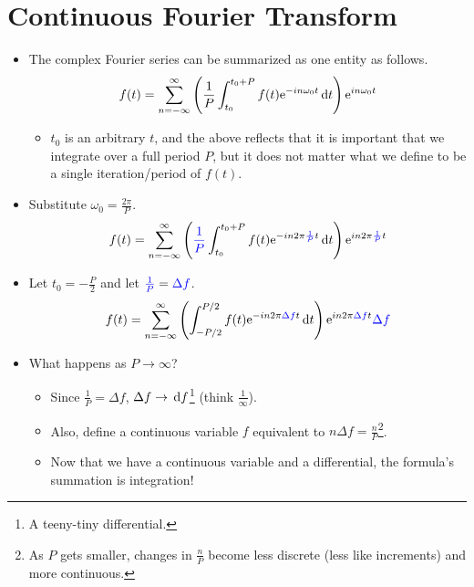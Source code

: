 \documentclass{article}
\begin{document}
\section*{Continuous Fourier Transform}
\begin{itemize}
    \item {}The complex Fourier series can be summarized as one entity as follows.
    \begin{equation*}
        f(t) = \sum_{n=-\infty}^\infty \left( \frac{1}{P}\int_{t_0}^{t_0+P} f(t)\e[-in\omega_0t]\D{t} \right)\e[in\omega_0t]
    \end{equation*}
    \begin{itemize}
        \item $t_0$ is an arbitrary $t$, and the above reflects that it is important that we integrate over a full period $P$, but it does not matter what we define to be a single iteration/period of $f(t)$.
    \end{itemize}
    \item Substitute $\omega_0 = \frac{2\pi}{P}$.
    \begin{equation*}
        f(t) = \sum_{n=-\infty}^\infty \left( {\color{blue}\frac{1}{P}}\int_{t_0}^{t_0+P} f(t)\e[-in2\pi{\color{blue}\frac{1}{P}}t]\D{t} \right)\e[in2\pi{\color{blue}\frac{1}{P}}t]
    \end{equation*}
    \item Let $t_0=-\frac{P}{2}$ and let ${\color{blue}\frac{1}{P}} = {\color{blue}\Delta f}$.
    \begin{equation*}
        f(t) = \sum_{n=-\infty}^\infty \left( \int_{-P/2}^{P/2} f(t)\e[-in2\pi{\color{blue}\Delta f}t]\D{t} \right)\e[in2\pi{\color{blue}\Delta f}t]{\color{blue}\Delta f}
    \end{equation*}
    \item What happens as $P\to\infty$?
    \begin{itemize}
        \item Since $\frac{1}{P} = \Delta f$, $\Delta f\to\D{f}$\footnote{A teeny-tiny differential.} (think $\frac{1}{\infty}$).
        \item Also, define a continuous variable $f$ equivalent to $n\Delta f = \frac{n}{P}$\footnote{As $P$ gets smaller, changes in $\frac{n}{P}$ become less discrete (less like increments) and more continuous.}.
        \item Now that we have a continuous variable and a differential, the formula's summation is integration!
    \end{itemize}

\end{itemize}
\end{document}
